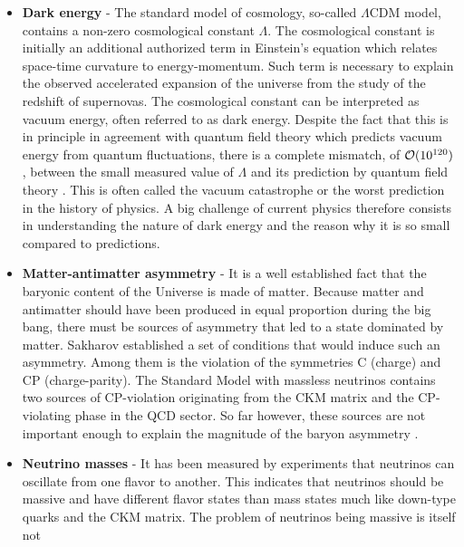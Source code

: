     \begin{itemize}
        \item \textbf{Dark energy} - The standard model of cosmology, so-called $\Lambda$CDM model,
            contains a non-zero cosmological constant $\Lambda$. The cosmological
            constant is initially an additional authorized term in Einstein's equation
            which relates space-time curvature to energy-momentum. Such term is necessary
            to explain the observed accelerated expansion of the universe from the study
            of the redshift of supernovas. The cosmological constant can be interpreted
            as vacuum energy, often referred to as dark energy. Despite the fact that this
            is in principle in agreement with quantum field theory which predicts vacuum
            energy from quantum fluctuations, there is a complete mismatch, of $\mathcal{O}(10^{120})$,
            between the small measured value of $\Lambda$ and its prediction by quantum
            field theory \cite{vacuumCatastrophe}. This is often called the vacuum catastrophe or the worst
            prediction in the history of physics. A big challenge of current physics therefore
            consists in understanding the nature of dark energy and the reason why it is so small
            compared to predictions.
        \item \textbf{Matter-antimatter asymmetry} - It is a well established fact that
            the baryonic content of the Universe is made of matter. Because matter and antimatter
            should have been produced in equal proportion during the big bang, there must
            be sources of asymmetry that led to a state dominated by matter. Sakharov \cite{Sakharov}
            established a set of conditions that would
            induce such an asymmetry. Among them is the violation of the symmetries C (charge)
            and CP (charge-parity). The Standard Model
            with massless neutrinos contains two sources of CP-violation originating from
            the CKM matrix and the CP-violating phase in the QCD sector. So far however,
            these sources are not important enough to explain the magnitude of the baryon
            asymmetry \cite{SMBaryogenesis}.
        \item \textbf{Neutrino masses} - It has been measured by experiments that neutrinos
            can oscillate from one flavor to another. This indicates that neutrinos should
            be massive and have different flavor states than mass states much like down-type
            quarks and the CKM matrix. The problem of neutrinos being massive is itself not

\end{itemize}
